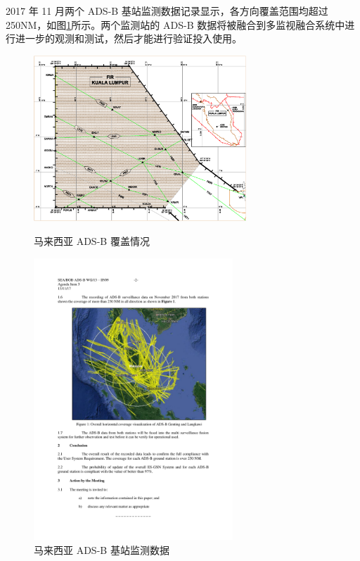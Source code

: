 2017 年 11 月两个 ADS-B 基站监测数据记录显示，各方向覆盖范围均超过 250NM，如图\ref{fig:Malaysia}所示。两个监测站的 ADS-B 数据将被融合到多监视融合系统中进行进一步的观测和测试，然后才能进行验证投入使用。

\begin{figure}[!htb]
\centering
\begin{minipage}[t]{0.50\textwidth}
\centering
\includegraphics[width=8cm]{pic/malaysia_cover.png}
\caption{马来西亚 ADS-B 覆盖情况\protect\footnotemark}
\label{fig:malaysia_cover}
\end{minipage}
\begin{minipage}[t]{0.48\textwidth}
\centering
\includegraphics[width=7.5cm]{pic/Malaysia.pdf}
\caption{马来西亚 ADS-B 基站监测数据\protect\footnotemark}
\label{fig:Malaysia}
\end{minipage}
\end{figure}



